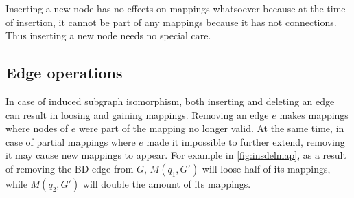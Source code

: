 Inserting a new node has no effects on mappings whatsoever because at the time of insertion,
it cannot be part of any mappings because it has not connections. Thus inserting a new node
needs no special care.

\subsection{Edge operations}

In case of induced subgraph isomorphism, both inserting and deleting an edge can result 
in loosing and gaining mappings. Removing an edge $e$ makes mappings where nodes of $e$
were part of the mapping no longer valid. At the same time, in case of partial mappings
where $e$ made it impossible to further extend, removing it may cause new mappings to
appear. For example in \ref{fig:insdelmap}, as a result of removing the BD edge from $G$,
$M(q_1, G')$ will loose half of its mappings, while $M(q_2, G')$ will double the amount of
its mappings. 

